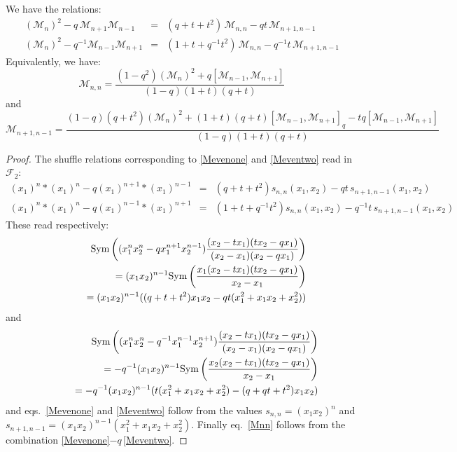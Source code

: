 \begin{lemma}\label{evenMlemma}
We have the relations:
\begin{eqnarray}
({\mathcal M}_n)^2 -q\, {\mathcal M}_{n+1}{\mathcal M}_{n-1}
&=&(q+t+t^2)\,{\mathcal M}_{n,n}-q t\, {\mathcal M}_{n+1,n-1} \label{Mevenone}\\
({\mathcal M}_n)^2 -q^{-1} {\mathcal M}_{n-1}{\mathcal M}_{n+1}
&=&(1+t+q^{-1}t^2)\,{\mathcal M}_{n,n}-q^{-1} t \,{\mathcal M}_{n+1,n-1} \label{Meventwo}
\end{eqnarray}
Equivalently, we have:
\begin{equation}\label{Mnn}  {\mathcal M}_{n,n}
=\frac{(1-q^2)({\mathcal M}_{n})^2+q \left[{\mathcal M}_{n-1},{\mathcal M}_{n+1}\right]}{(1-q)(1+t)(q+t)}
\end{equation}
and
\begin{equation}\label{Mnnplus}  {\mathcal M}_{n+1,n-1}
=\frac{(1-q)(q+t^2)({\mathcal M}_{n})^2+(1+t)(q+t)\left[{\mathcal M}_{n-1},{\mathcal M}_{n+1}\right]_q
-t q \left[{\mathcal M}_{n-1},{\mathcal M}_{n+1}\right]}{(1-q)(1+t)(q+t)}
\end{equation}
\end{lemma}
\begin{proof}
The shuffle relations corresponding to \eqref{Mevenone} and \eqref{Meventwo} read
in ${\mathcal F}_2$:
\begin{eqnarray*} 
(x_1)^n * (x_1)^{n}-q (x_1)^{n+1} * (x_1)^{n-1}&=& (q+t+t^2)s_{n,n}(x_1,x_2)-q t \,s_{n+1,n-1}(x_1,x_2)\\
(x_1)^n * (x_1)^{n}-q (x_1)^{n-1} * (x_1)^{n+1}&=& (1+t+q^{-1}t^2)s_{n,n}(x_1,x_2)-q^{-1} t \,s_{n+1,n-1}(x_1,x_2)
\end{eqnarray*}
These read respectively:
\begin{eqnarray*}&&{\rm Sym}\left( ( x_1^n x_2^{n}-q x_1^{n+1}x_{2}^{n-1})
\frac{(x_2-t x_1)(t x_2-q x_1)}{(x_2-x_1)(x_2-q x_1)} \right)\\
&&\qquad=(x_1x_2)^{n-1}{\rm Sym}\left(\frac{x_1(x_2-t x_1)(t x_2-q x_1)}{x_2-x_1}\right)\\
&&\qquad=(x_1x_2)^{n-1}((q+t+t^2)x_1x_2-q t (x_1^2+x_1 x_2+x_2^2))
\end{eqnarray*}
and
\begin{eqnarray*}&&{\rm Sym}\left( ( x_1^n x_2^{n}-q^{-1} x_1^{n-1}x_{2}^{n+1})
\frac{(x_2-t x_1)(t x_2-q x_1)}{(x_2-x_1)(x_2-q x_1)} \right)\\
&&\qquad=-q^{-1}(x_1x_2)^{n-1}{\rm Sym}\left(\frac{x_2(x_2-t x_1)(t x_2-q x_1)}{x_2-x_1}\right)\\
&&\qquad=-q^{-1}(x_1x_2)^{n-1}(t (x_1^2+x_1 x_2+x_2^2)-(q+qt+t^2)x_1x_2)
\end{eqnarray*}
and eqs.~\ref{Mevenone} and \ref{Meventwo} follow from the values $s_{n,n}=(x_1x_2)^n$ and $s_{n+1,n-1}=(x_1x_2)^{n-1}(x_1^2+x_1x_2+x_2^2)$. Finally eq.~\eqref{Mnn} follows from the combination \eqref{Mevenone}$- q\, $\eqref{Meventwo}.
\end{proof}

